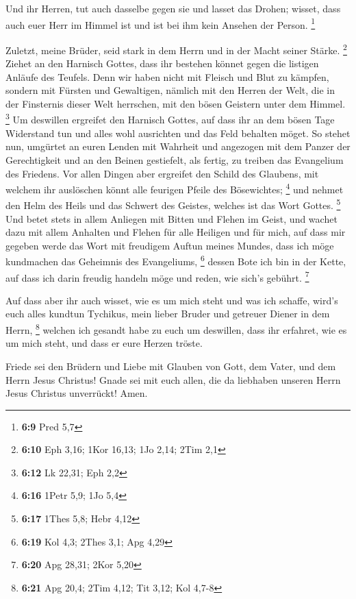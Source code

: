  Und ihr Herren, tut auch dasselbe gegen sie und lasset
das Drohen; wisset, dass auch euer Herr im Himmel ist und ist bei ihm
kein Ansehen der Person. \footnote{\textbf{6:9} Pred 5,7}

 Zuletzt, meine Brüder, seid stark in dem Herrn und in
der Macht seiner Stärke. \footnote{\textbf{6:10} Eph 3,16; 1Kor 16,13;
  1Jo 2,14; 2Tim 2,1}  Ziehet an den Harnisch Gottes,
dass ihr bestehen könnet gegen die listigen Anläufe des Teufels.
 Denn wir haben nicht mit Fleisch und Blut zu kämpfen,
sondern mit Fürsten und Gewaltigen, nämlich mit den Herren der Welt, die
in der Finsternis dieser Welt herrschen, mit den bösen Geistern unter
dem Himmel. \footnote{\textbf{6:12} Lk 22,31; Eph 2,2} 
Um deswillen ergreifet den Harnisch Gottes, auf dass ihr an dem bösen
Tage Widerstand tun und alles wohl ausrichten und das Feld behalten
möget.  So stehet nun, umgürtet an euren Lenden mit
Wahrheit und angezogen mit dem Panzer der Gerechtigkeit 
und an den Beinen gestiefelt, als fertig, zu treiben das Evangelium des
Friedens.  Vor allen Dingen aber ergreifet den Schild des
Glaubens, mit welchem ihr auslöschen könnt alle feurigen Pfeile des
Bösewichtes; \footnote{\textbf{6:16} 1Petr 5,9; 1Jo 5,4} 
und nehmet den Helm des Heils und das Schwert des Geistes, welches ist
das Wort Gottes. \footnote{\textbf{6:17} 1Thes 5,8; Hebr 4,12}
 Und betet stets in allem Anliegen mit Bitten und Flehen
im Geist, und wachet dazu mit allem Anhalten und Flehen für alle
Heiligen  und für mich, auf dass mir gegeben werde das
Wort mit freudigem Auftun meines Mundes, dass ich möge kundmachen das
Geheimnis des Evangeliums, \footnote{\textbf{6:19} Kol 4,3; 2Thes 3,1;
  Apg 4,29}  dessen Bote ich bin in der Kette, auf dass
ich darin freudig handeln möge und reden, wie sich's gebührt.
\footnote{\textbf{6:20} Apg 28,31; 2Kor 5,20}

 Auf dass aber ihr auch wisset, wie es um mich steht und
was ich schaffe, wird's euch alles kundtun Tychikus, mein lieber Bruder
und getreuer Diener in dem Herrn, \footnote{\textbf{6:21} Apg 20,4; 2Tim
  4,12; Tit 3,12; Kol 4,7-8}  welchen ich gesandt habe zu
euch um deswillen, dass ihr erfahret, wie es um mich steht, und dass er
eure Herzen tröste.

 Friede sei den Brüdern und Liebe mit Glauben von Gott,
dem Vater, und dem Herrn Jesus Christus!  Gnade sei mit
euch allen, die da liebhaben unseren Herrn Jesus Christus unverrückt!
Amen.
